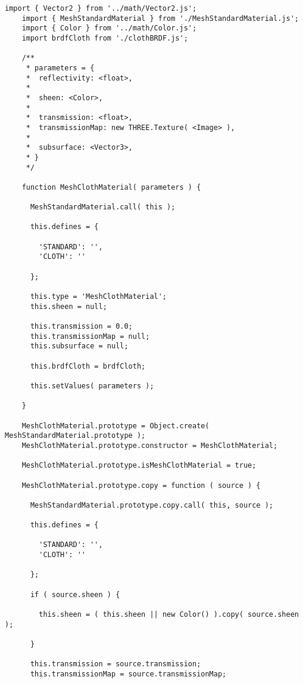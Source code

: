 \bgroup
  \begin{lstlisting}[caption=Clase MeshClothMaterial]
    import { Vector2 } from '../math/Vector2.js';
    import { MeshStandardMaterial } from './MeshStandardMaterial.js';
    import { Color } from '../math/Color.js';
    import brdfCloth from './clothBRDF.js';
    
    /**
     * parameters = {
     *  reflectivity: <float>,
     *
     *  sheen: <Color>,
     *
     *  transmission: <float>,
     *  transmissionMap: new THREE.Texture( <Image> ),
     *
     *  subsurface: <Vector3>,
     * }
     */
    
    function MeshClothMaterial( parameters ) {
    
      MeshStandardMaterial.call( this );
    
      this.defines = {
    
        'STANDARD': '',
        'CLOTH': ''
    
      };
    
      this.type = 'MeshClothMaterial';
      this.sheen = null;
    
      this.transmission = 0.0;
      this.transmissionMap = null;
      this.subsurface = null;
    
      this.brdfCloth = brdfCloth;
    
      this.setValues( parameters );
    
    }
    
    MeshClothMaterial.prototype = Object.create( MeshStandardMaterial.prototype );
    MeshClothMaterial.prototype.constructor = MeshClothMaterial;
    
    MeshClothMaterial.prototype.isMeshClothMaterial = true;
    
    MeshClothMaterial.prototype.copy = function ( source ) {
    
      MeshStandardMaterial.prototype.copy.call( this, source );
    
      this.defines = {
    
        'STANDARD': '',
        'CLOTH': ''
    
      };
    
      if ( source.sheen ) {
    
        this.sheen = ( this.sheen || new Color() ).copy( source.sheen );
    
      }
    
      this.transmission = source.transmission;
      this.transmissionMap = source.transmissionMap;
    

\end{lstlisting}
